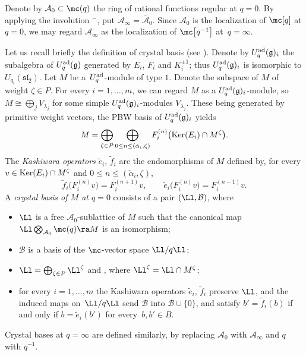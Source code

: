 Denote by $\mathcal{A}_0\subset \mc(q)$ the ring of rational functions regular at $q=0$. By applying the involution ${}^-$, put $\mathcal{A}_\infty=\overline{\mathcal{A}}_0$.
Since $\mathcal{A}_0$ is the localization of $\mc[q]$ at $q=0$, we may regard $\mathcal{A}_\infty$ as the localization of $\mc\big[q^{-1}\big]$ at~${q=\infty}$.

Let us recall briefly the definition of crystal basis (see \cite{Kashiwara1}). Denote by $U_q^{\rm ad}(\mathfrak{g})_i$ the subalgebra of $U_q^{\rm ad}(\mathfrak{g})$ generated by $E_i$, $F_i$ and $K_i^{\pm 1}$; thus $U_q^{\rm ad}(\mathfrak{g})_i$ is isomorphic to $U_{q_i}({\mathfrak{sl}_2})$. Let $M$ be a~$U_q^{\rm ad}$-module of type $1$. Denote  the subspace of $M$ of weight $\zeta\in P$. For every $i=1,\dots, m$, we can regard $M$ as a $U_q^{\rm ad}(\mathfrak{g})_i$-module, so $M\cong \bigoplus_j V_{\lambda_j}$ for some simple $U_q^{\rm ad}(\mathfrak{g})_i$-modules $V_{\lambda_j}$. These being generated by primitive weight vectors, the PBW basis of $U_q^{\rm ad}(\mathfrak{g})_i$ yields
\[M = \bigoplus_{\zeta\in P} \bigoplus_{0\leq n\leq (\check{\alpha}_i, \zeta)} F_i^{(n)}\big({\rm Ker}(E_i)\cap M^\zeta\big).\]
The {\it Kashiwara operators} $\tilde{e}_i$, $\tilde{f}_i$ are the endomorphisms of $M$ defined by, for every $v\in {\rm Ker}(E_i)\cap M^\zeta$ and $0\leq n\leq (\check{\alpha}_i, \zeta)$,
\[%
\tilde{f}_i\big(F_i^{(n)}v\big) = F_i^{(n+1)}v,\qquad \tilde{e}_i\big(F_i^{(n)}v\big) = F_i^{(n-1)}v.
\]
A {\it crystal basis of $M$ at $q=0$} consists of a pair $(\Ll, \mathcal{B})$, where
\begin{itemize}\itemsep=0pt
\item $\Ll$ is a free $\mathcal{A}_0$-sublattice of $M$ such that the canonical map $\Ll \bigotimes_{\mathcal{A}_0} \mc(q) \ra M$ is an isomorphism;
\item $\mathcal{B}$ is a basis of the $\mc$-vector space $\Ll/q\Ll$;
\item $ \Ll = \bigoplus_{\zeta \in P} \Ll^\zeta$ and , where $\Ll^\zeta = \Ll\cap M^\zeta$;
\item for every $i=1,\dots, m$ the Kashiwara operators $\tilde{e}_i$, $\tilde{f}_i$ preserve $\Ll$, and the induced maps on~$\Ll/q\Ll$ send $\mathcal{B}$ into $\mathcal{B}\cup \{0\}$, and satisfy $b' = \tilde{f}_i(b)$ if and only if $b=\tilde{e}_i(b')$ for every~${b,b'\in B}$.
\end{itemize}
Crystal bases at $q=\infty$ are defined similarly, by replacing $\mathcal{A}_0$ with $\mathcal{A}_\infty$ and $q$ with $q^{-1}$.


